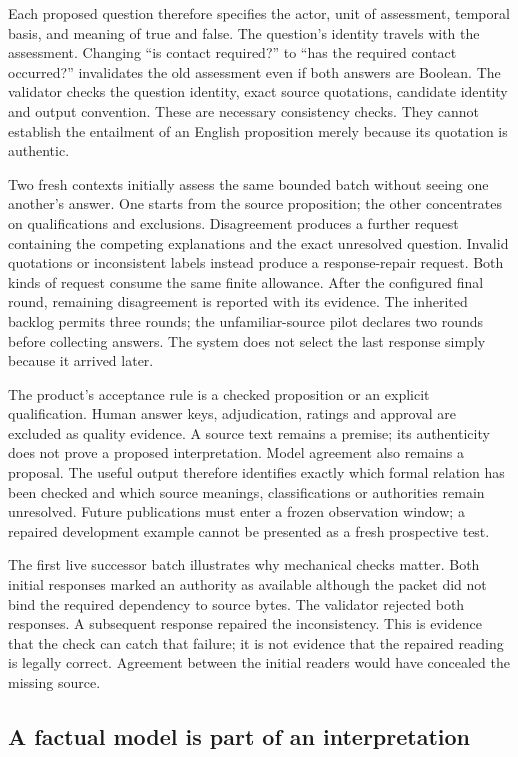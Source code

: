 Each proposed question therefore specifies the actor, unit of assessment,
temporal basis, and meaning of true and false. The question's identity travels
with the assessment. Changing ``is contact required?'' to ``has the required
contact occurred?'' invalidates the old assessment even if both answers are
Boolean. The validator checks the question identity, exact source quotations,
candidate identity and output convention. These are necessary consistency
checks. They cannot establish the entailment of an English proposition merely
because its quotation is authentic.

Two fresh contexts initially assess the same bounded batch without seeing one
another's answer. One starts from the source proposition; the other concentrates
on qualifications and exclusions. Disagreement produces a further request
containing the competing explanations and the exact unresolved question.
Invalid quotations or inconsistent labels instead produce a response-repair
request. Both kinds of request consume the same finite allowance. After the
configured final round, remaining disagreement is reported with its evidence.
The inherited backlog permits three rounds; the unfamiliar-source pilot
declares two rounds before collecting answers. The system
does not select the last response simply because it arrived later.

The product's acceptance rule is a checked proposition or an explicit
qualification. Human answer keys, adjudication, ratings and approval are
excluded as quality evidence. A source text remains a premise; its authenticity
does not prove a proposed interpretation. Model agreement also remains a
proposal. The useful output therefore identifies exactly which formal relation
has been checked and which source meanings, classifications or authorities
remain unresolved. Future publications must enter a frozen observation window;
a repaired development example cannot be presented as a fresh prospective test.

The first live successor batch illustrates why mechanical checks matter.
Both initial responses marked an authority as available although the packet
did not bind the required dependency to source bytes. The validator rejected
both responses. A subsequent response repaired the inconsistency. This is
evidence that the check can catch that failure; it is not evidence that the
repaired reading is legally correct. Agreement between the initial readers
would have concealed the missing source.

\subsection{A factual model is part of an interpretation}


